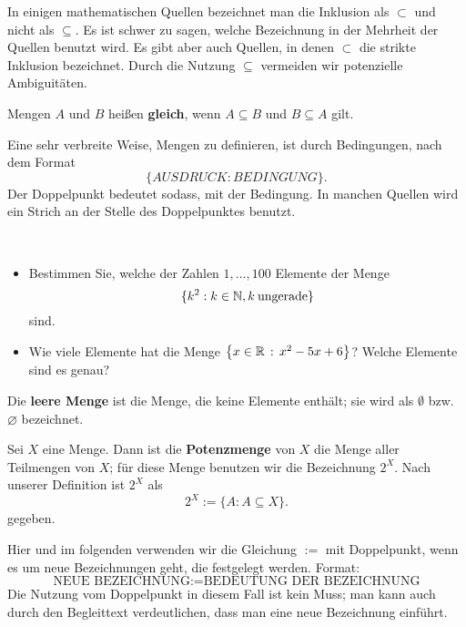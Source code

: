 \begin{bem}
In einigen mathematischen Quellen bezeichnet man die Inklusion als $ \subset $ und nicht als $ \subseteq $. Es ist schwer zu sagen, welche Bezeichnung in der Mehrheit der Quellen benutzt wird. Es gibt aber auch Quellen, in denen $ \subset $ die strikte Inklusion bezeichnet. Durch die Nutzung $\subseteq$ vermeiden wir potenzielle Ambiguitäten. 
\end{bem} 

\begin{defn}
	 Mengen $ A $ und $ B $ heißen \textbf{gleich}, wenn $ A \subseteq B $ und $ B \subseteq A $ gilt. 
\end{defn} 


\begin{bem}
Eine sehr verbreite Weise, Mengen zu definieren, ist durch Bedingungen, nach dem Format 
\[
 \{ AUSDRUCK : BEDINGUNG \}.
\] Der Doppelpunkt bedeutet \glqq sodass\grqq, \glqq mit der Bedingung\grqq. In manchen Quellen wird ein Strich an der Stelle des Doppelpunktes benutzt. 
\end{bem} 

\begin{aufg}\ 
\begin{itemize}
\item Bestimmen Sie, welche der Zahlen $1,\ldots, 100$ Elemente der Menge 
\[
	 \{ k^2 : k \in \mathbb{N}, k \: \text{ungerade} \} 
\]
sind. 
\item Wie viele Elemente hat die Menge $\left\{ x \in \mathbb{R} \,:\, x^2- 5 x + 6 \right\} $? Welche Elemente sind es genau? 
\end{itemize}
\end{aufg}

\begin{defn}
Die \textbf{leere Menge} ist die Menge, die keine Elemente enthält; sie wird als $ \emptyset $ bzw. $\varnothing$ bezeichnet. 
\end{defn} 

\begin{defn}[Potenzmenge]
Sei $ X $ eine Menge. Dann ist die \textbf{Potenzmenge} von $ X $ die Menge aller Teilmengen von $ X $; für diese Menge benutzen wir die Bezeichnung $ 2^X $. Nach unserer Definition ist $2^X$ als  
\[
	 2^X := \{ A : A \subseteq X \} .
\]
gegeben. 
\end{defn} 

\begin{bem} Hier und im folgenden verwenden wir die Gleichung $:=$ mit Doppelpunkt, wenn es um neue Bezeichnungen geht, die festgelegt werden. Format: 
	\[
		\text{NEUE BEZEICHNUNG} := \text{BEDEUTUNG DER BEZEICHNUNG}
	\]
	Die Nutzung vom Doppelpunkt in diesem Fall ist kein Muss; man kann auch durch den Begleittext verdeutlichen, dass man eine neue Bezeichnung einführt. 
\end{bem} 

